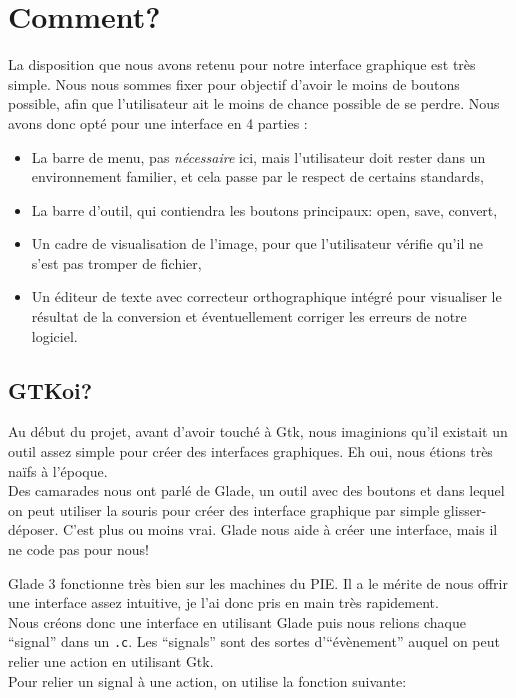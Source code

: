 \documentclass[a4paper,10pt]{report}
\begin{document}

\section{Comment?} %
\label{sec:comment_}
La disposition que nous avons retenu pour notre interface graphique est très simple. Nous nous sommes fixer pour objectif d’avoir le moins de boutons possible, afin que l’utilisateur ait le moins de chance possible de se perdre. 
Nous avons donc opté pour une interface en 4 parties :\\

\begin{itemize}
	\item La barre de menu, pas \emph{nécessaire} ici, mais l’utilisateur doit rester dans un environnement familier, et cela passe par le respect de certains standards,
	\item La barre d’outil, qui contiendra les boutons principaux: open, save, convert,
	\item Un cadre de visualisation de l’image, pour que l’utilisateur vérifie qu’il ne s’est pas tromper de fichier,
	\item Un éditeur de texte avec correcteur orthographique intégré pour visualiser le résultat de la conversion et éventuellement corriger les erreurs de notre logiciel.
\end{itemize}



\subsection{GTKoi?} %
\label{sec:gtkoi_}
Au début du projet, avant d’avoir touché à Gtk, nous imaginions qu’il existait un outil assez simple pour créer des interfaces graphiques. Eh oui, nous étions très naïfs à l’époque. \\
Des camarades nous ont parlé de Glade, un outil avec des boutons et dans lequel on peut utiliser la souris pour créer des interface graphique par simple glisser-déposer. C'est plus ou moins vrai. Glade nous aide à créer une interface, mais il ne code pas pour nous! 

Glade 3 fonctionne tr\`es bien sur les machines du PIE. Il a le m\'erite de nous offrir une interface assez intuitive, je l'ai donc pris en main tr\`es rapidement.\\
Nous cr\'eons donc une interface en utilisant Glade puis nous relions chaque ``signal'' dans un \texttt{.c}. Les ``signals'' sont des sortes d'``\'ev\`enement'' auquel on peut relier une action en utilisant Gtk.\\
Pour relier un signal \`a une action, on utilise la fonction suivante:
\end{document}
